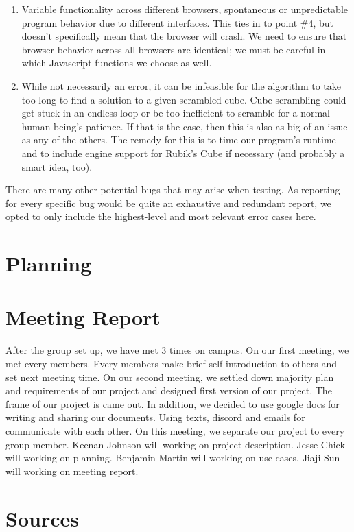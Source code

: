 \documentclass[12pt]{article}
\begin{document}
\begin{enumerate}
\item Variable functionality across different browsers, spontaneous or unpredictable program behavior due to different interfaces. This ties in to point \#4, but doesn’t specifically mean that the browser will crash. We need to ensure that browser behavior across all browsers are identical; we must be careful in which Javascript functions we choose as well.
\item While not necessarily an error, it can be infeasible for the algorithm to take too long to find a solution to a given scrambled cube. Cube scrambling could get stuck in an endless loop or be too inefficient to scramble for a normal human being’s patience. If that is the case, then this is also as big of an issue as any of the others. The remedy for this is to time our program’s runtime and to include engine support for Rubik’s Cube if necessary (and probably a smart idea, too).
\end{enumerate}
\par
There are many other potential bugs that may arise when testing. As reporting for every specific bug would be quite an exhaustive and redundant report, we opted to only include the highest-level and most relevant error cases here. \\

\section{Planning}


\section{Meeting Report}
\par
After the group set up, we have met 3 times on campus.  On our first meeting, we met every members. Every members make brief self introduction to others and set next meeting time. On our second meeting, we settled down majority plan and requirements of our project and designed first version of our project. The frame of our project is came out. In addition, we decided to use google docs for writing and sharing our documents. Using texts, discord and emails for communicate with each other. On this meeting, we separate our project to every group member. Keenan Johnson will working on project description. Jesse Chick will working on planning. Benjamin Martin will working on use cases. Jiaji Sun will working on meeting report. \\

\section{Sources}

\cite{rubtut}



\end{document}
